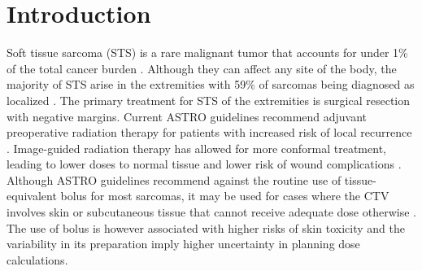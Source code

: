 \documentclass[aapm,graphicx,superscriptaddress]{revtex4-1}
\begin{document}
\pacs{}

\maketitle
\setlength{\baselineskip}{0.7cm}
\section{Introduction}
Soft tissue sarcoma (STS) is a rare malignant tumor that accounts for under 1\% of the total cancer burden \cite{cancerstats2022}. Although they can affect any site of the body, the majority of STS arise in the extremities with 59\% of sarcomas being diagnosed as localized \cite{seer2022}. The primary treatment for STS of the extremities is surgical resection with negative margins. %
Current ASTRO guidelines recommend adjuvant preoperative radiation therapy for patients with increased risk of local recurrence \cite{SALERNO2021339}. Image-guided radiation therapy has allowed for more conformal treatment, leading to lower doses to normal tissue and lower risk of wound complications \cite{OSullivan2013, RTOG0630}. Although ASTRO guidelines recommend against the routine use of tissue-equivalent bolus for most sarcomas, it may be used for cases where the CTV involves skin or subcutaneous tissue that cannot receive adequate dose otherwise \cite{SALERNO2021339}. The use of bolus is however associated with higher risks of skin toxicity \cite{PIGNOL2015157, PAREKH20188, WONG2020462} and the variability in its preparation imply higher uncertainty in planning dose calculations.\\
\end{document}
